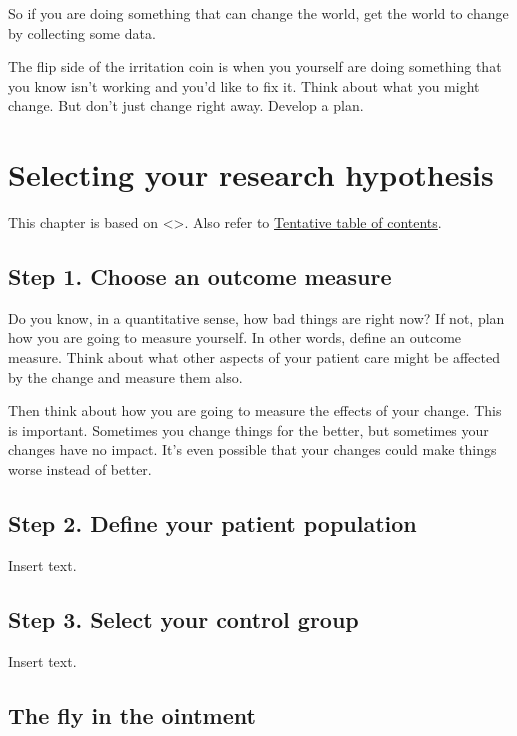 \documentclass[
  letterpaper,
  DIV=11,
  numbers=noendperiod]{scrreprt}
\begin{document}
So if you are doing something that can change the world, get the world
to change by collecting some data.

The flip side of the irritation coin is when you yourself are doing
something that you know isn't working and you'd like to fix it. Think
about what you might change. But don't just change right away. Develop a
plan.


\chapter{Selecting your research
hypothesis}\label{selecting-your-research-hypothesis}

This chapter is based on \textless{}\textgreater. Also refer to
\href{http://www.pmean.com/10/Contents.html}{Tentative table of
contents}.

\section{Step 1. Choose an outcome
measure}\label{step-1.-choose-an-outcome-measure}

Do you know, in a quantitative sense, how bad things are right now? If
not, plan how you are going to measure yourself. In other words, define
an outcome measure. Think about what other aspects of your patient care
might be affected by the change and measure them also.

Then think about how you are going to measure the effects of your
change. This is important. Sometimes you change things for the better,
but sometimes your changes have no impact. It's even possible that your
changes could make things worse instead of better.

\section{Step 2. Define your patient
population}\label{step-2.-define-your-patient-population}

Insert text.

\section{Step 3. Select your control
group}\label{step-3.-select-your-control-group}

Insert text.

\section{The fly in the ointment}\label{the-fly-in-the-ointment}
\end{document}
